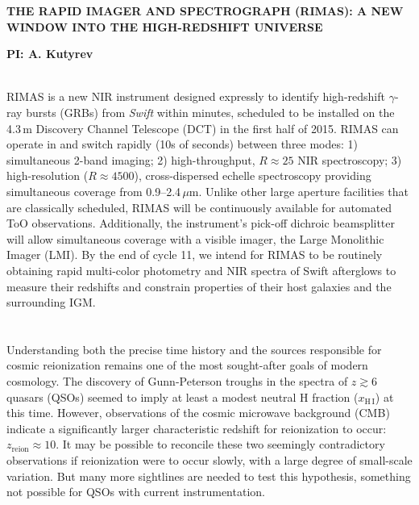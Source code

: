 \documentclass[letterpaper,11pt]{article}
\begin{document}
\pagestyle{plain}

\begin{center} 
\bfseries\uppercase{The Rapid IMAger and Spectrograph (RIMAS): A New Window
	into the High-Redshift Universe}
\end{center}
\vspace{-0.3cm}
\centerline{\bf PI: {A. Kutyrev}}
 
\smallskip\\
RIMAS is a new NIR instrument designed expressly to identify high-redshift 
$\gamma$-ray bursts (GRBs) from \textit{Swift} within minutes, scheduled to be installed on the 
4.3\,m Discovery Channel Telescope (DCT) in the first half of 2015. RIMAS can operate in and switch 
rapidly (10s of seconds) between three modes: 1) simultaneous 2-band imaging; 2) high-throughput, $R \approx 25$ 
NIR spectroscopy; 3) high-resolution ($R \approx 4500$), cross-dispersed echelle spectroscopy providing 
simultaneous coverage from 0.9--2.4\,$\mu$m. Unlike other large aperture facilities that 
are classically scheduled, RIMAS will be continuously available for automated ToO observations. 
Additionally, the instrument's pick-off dichroic beamsplitter will allow simultaneous coverage with a visible imager, 
the Large Monolithic Imager (LMI). By the end of cycle 11, we intend for RIMAS to be routinely 
obtaining rapid multi-color photometry and NIR spectra of Swift afterglows to measure 
their redshifts and constrain properties of their host galaxies and the surrounding 
IGM. \\

\smallskip\\
\smallskip\\
Understanding both the precise time history and the sources responsible for cosmic
reionization remains one of the most sought-after goals of modern cosmology.  The 
discovery of Gunn-Peterson troughs in the spectra of $z \gtrsim 6$ quasars 
(QSOs\cite{bfw+01}) seemed to imply at least a modest neutral H fraction 
($x_{\mathrm{H\,I}}$) at this time.  However, observations of the cosmic microwave
background (CMB\cite{hlk+13}) indicate a significantly larger characteristic redshift 
for reionization to occur: $z_\mathrm{reion} \approx 10$.  It may be 
possible to reconcile these two seemingly contradictory observations if reionization
were to occur slowly, with a large degree of small-scale variation.  But many more
sightlines are needed to test this hypothesis, something not possible for QSOs
with current instrumentation.
\end{document}
